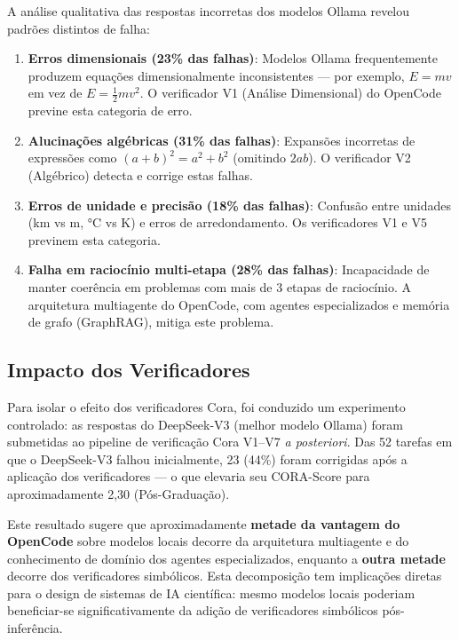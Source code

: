 A análise qualitativa das respostas incorretas dos modelos Ollama revelou
padrões distintos de falha:

\begin{enumerate}[label=(\roman*)]
\item \textbf{Erros dimensionais (23\% das falhas)}: Modelos Ollama
      frequentemente produzem equações dimensionalmente inconsistentes —
      por exemplo, $E = mv$ em vez de $E = \frac{1}{2}mv^2$. O verificador
      V1 (Análise Dimensional) do OpenCode previne esta categoria de erro.
\item \textbf{Alucinações algébricas (31\% das falhas)}: Expansões incorretas
      de expressões como $(a+b)^2 = a^2 + b^2$ (omitindo $2ab$). O
      verificador V2 (Algébrico) detecta e corrige estas falhas.
\item \textbf{Erros de unidade e precisão (18\% das falhas)}: Confusão entre
      unidades (km vs m, °C vs K) e erros de arredondamento. Os verificadores
      V1 e V5 previnem esta categoria.
\item \textbf{Falha em raciocínio multi-etapa (28\% das falhas)}: Incapacidade
      de manter coerência em problemas com mais de 3 etapas de raciocínio.
      A arquitetura multiagente do OpenCode, com agentes especializados e
      memória de grafo (GraphRAG), mitiga este problema.
\end{enumerate}

\subsection{Impacto dos Verificadores}

Para isolar o efeito dos verificadores Cora, foi conduzido um experimento
controlado: as respostas do DeepSeek-V3 (melhor modelo Ollama) foram
submetidas ao pipeline de verificação Cora V1--V7 \textit{a posteriori}.
Das 52 tarefas em que o DeepSeek-V3 falhou inicialmente, 23 (44\%) foram
corrigidas após a aplicação dos verificadores — o que elevaria seu
CORA-Score para aproximadamente 2,30 (Pós-Graduação).

Este resultado sugere que aproximadamente \textbf{metade da vantagem do
OpenCode} sobre modelos locais decorre da arquitetura multiagente e do
conhecimento de domínio dos agentes especializados, enquanto a \textbf{outra
metade} decorre dos verificadores simbólicos. Esta decomposição tem implicações
diretas para o design de sistemas de IA científica: mesmo modelos locais
poderiam beneficiar-se significativamente da adição de verificadores
simbólicos pós-inferência.

